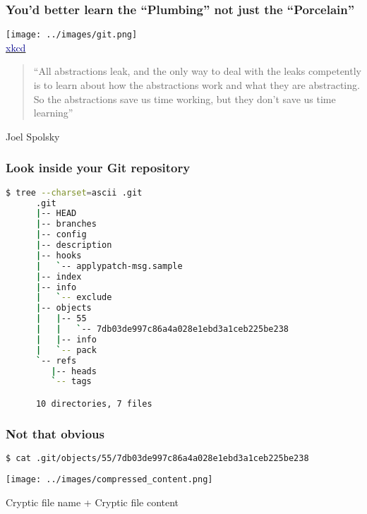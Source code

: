 \begin{frame}\frametitle{You'd better learn the ``Plumbing'' not just the ``Porcelain''}
   \begin{minipage}{0.48\linewidth}
      \texttt{[image: ../images/git.png]} \\
      \centering\href{https://xkcd.com/1597/}{\textcolor{DarkBlue}{xkcd}}
   \end{minipage}
   \begin{minipage}{0.48\linewidth}
      \begin{quote}
         ``All abstractions leak, and the only way to deal with the leaks competently is
         to learn about how the abstractions work and what they are abstracting.
         So the abstractions save us time working, but they don’t save us time learning''
      \end{quote}
      \begin{flushright}
         Joel Spolsky
      \end{flushright}
      \end{minipage}
\end{frame}

\begin{frame}[fragile]\frametitle{Look inside your Git repository}
   \begin{lstlisting}[language=bash, style=bash, autogobble]
      $ tree --charset=ascii .git
      .git
      |-- HEAD
      |-- branches
      |-- config
      |-- description
      |-- hooks
      |   `-- applypatch-msg.sample
      |-- index
      |-- info
      |   `-- exclude
      |-- objects
      |   |-- 55
      |   |   `-- 7db03de997c86a4a028e1ebd3a1ceb225be238
      |   |-- info
      |   `-- pack
      `-- refs
         |-- heads
         `-- tags

      10 directories, 7 files
   \end{lstlisting}
\end{frame}

\begin{frame}[fragile]\frametitle{Not that obvious}
   \begin{lstlisting}[language=bash, style=bash]
      $ cat .git/objects/55/7db03de997c86a4a028e1ebd3a1ceb225be238
   \end{lstlisting}
   \begin{center}
      \texttt{[image: ../images/compressed\_content.png]}
   \end{center}
   \vspace{1em}
   \begin{center}
      Cryptic file name + Cryptic file content
   \end{center}
\end{frame}

